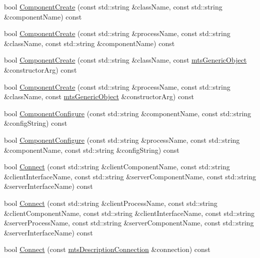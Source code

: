 {\bf }\par
\begin{DoxyCompactItemize}
\item 
bool \hyperlink{classmts_manager_component_services_a31785266eab548a48d80fa2ed08bc014}{Component\+Create} (const std\+::string \&class\+Name, const std\+::string \&component\+Name) const 
\item 
bool \hyperlink{classmts_manager_component_services_ac599f7d70cb120ece10738d85d20769f}{Component\+Create} (const std\+::string \&process\+Name, const std\+::string \&class\+Name, const std\+::string \&component\+Name) const 
\item 
bool \hyperlink{classmts_manager_component_services_a42295c2a3b32c5c0a1cc60b06f9ecc83}{Component\+Create} (const std\+::string \&class\+Name, const \hyperlink{classmts_generic_object}{mts\+Generic\+Object} \&constructor\+Arg) const 
\item 
bool \hyperlink{classmts_manager_component_services_a0dab190b31f59d5cfd2084ecbc4a2f66}{Component\+Create} (const std\+::string \&process\+Name, const std\+::string \&class\+Name, const \hyperlink{classmts_generic_object}{mts\+Generic\+Object} \&constructor\+Arg) const 
\item 
bool \hyperlink{classmts_manager_component_services_a2bf55bf6eaaa1c9d06e014fa1ea5c5f3}{Component\+Configure} (const std\+::string \&component\+Name, const std\+::string \&config\+String) const 
\item 
bool \hyperlink{classmts_manager_component_services_a6f13d3fc2eebbc1a21199c7554aae16e}{Component\+Configure} (const std\+::string \&process\+Name, const std\+::string \&component\+Name, const std\+::string \&config\+String) const 
\item 
bool \hyperlink{classmts_manager_component_services_a862a86135ddef6f3c7fc771ecbf395d8}{Connect} (const std\+::string \&client\+Component\+Name, const std\+::string \&client\+Interface\+Name, const std\+::string \&server\+Component\+Name, const std\+::string \&server\+Interface\+Name) const 
\item 
bool \hyperlink{classmts_manager_component_services_a31924511ca987ea4c7f632f91e922b83}{Connect} (const std\+::string \&client\+Process\+Name, const std\+::string \&client\+Component\+Name, const std\+::string \&client\+Interface\+Name, const std\+::string \&server\+Process\+Name, const std\+::string \&server\+Component\+Name, const std\+::string \&server\+Interface\+Name) const 
\item 
bool \hyperlink{classmts_manager_component_services_a0dd0677b3e5877c80caf8f7f53ad69f4}{Connect} (const \hyperlink{classmts_description_connection}{mts\+Description\+Connection} \&connection) const 

\end{DoxyCompactItemize}
